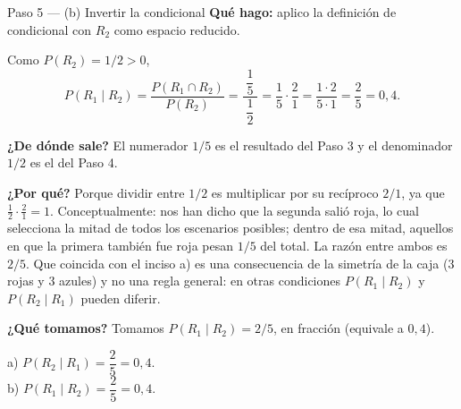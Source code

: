 \documentclass[11pt]{article}
\begin{document}
\begin{paso}{Paso 5 --- (b) Invertir la condicional}
\textbf{Qué hago:} aplico la definición de condicional con $R_2$ como espacio reducido.

Como $P(R_2)=1/2>0$,
\[
P(R_1\mid R_2)=\frac{P(R_1\cap R_2)}{P(R_2)}=\frac{\;\dfrac{1}{5}\;}{\;\dfrac{1}{2}\;}
=\frac{1}{5}\cdot\frac{2}{1}=\frac{1\cdot 2}{5\cdot 1}=\frac{2}{5}=0{,}4.
\]

\textbf{¿De dónde sale?} El numerador $1/5$ es el resultado del Paso 3 y el denominador $1/2$ es el del Paso 4.

\textbf{¿Por qué?} Porque dividir entre $1/2$ es multiplicar por su recíproco $2/1$, ya que $\frac{1}{2}\cdot\frac{2}{1}=1$. Conceptualmente: nos han dicho que la segunda salió roja, lo cual selecciona la mitad de todos los escenarios posibles; dentro de esa mitad, aquellos en que la primera también fue roja pesan $1/5$ del total. La razón entre ambos es $2/5$. Que coincida con el inciso a) es una consecuencia de la simetría de la caja ($3$ rojas y $3$ azules) y no una regla general: en otras condiciones $P(R_1\mid R_2)$ y $P(R_2\mid R_1)$ pueden diferir.

\textbf{¿Qué tomamos?} Tomamos $P(R_1\mid R_2)=2/5$, en fracción (equivale a $0{,}4$).
\end{paso}

\begin{resp}
a) $P(R_2\mid R_1)=\dfrac{2}{5}=0{,}4$.\\[2pt]
b) $P(R_1\mid R_2)=\dfrac{2}{5}=0{,}4$.
\end{resp}
\end{document}
